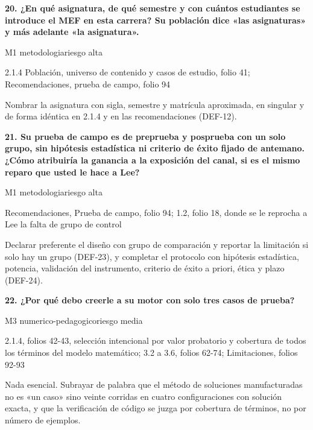 \noindent\casilla\textbf{20. ¿En qué asignatura, de qué semestre y con cuántos estudiantes se introduce el MEF en esta carrera? Su población dice «las asignaturas» y más adelante «la asignatura».}\par
{\small\color{gris}\sffamily M1 metodologia\quad{}\quad riesgo alta}\par
{\small{}2.1.4 Población, universo de contenido y casos de estudio, folio 41; Recomendaciones, prueba de campo, folio 94\par}
{\small{}Nombrar la asignatura con sigla, semestre y matrícula aproximada, en singular y de forma idéntica en 2.1.4 y en las recomendaciones (DEF-12).\par}
\vspace{5pt}
\noindent\casilla\textbf{21. Su prueba de campo es de preprueba y posprueba con un solo grupo, sin hipótesis estadística ni criterio de éxito fijado de antemano. ¿Cómo atribuiría la ganancia a la exposición del canal, si es el mismo reparo que usted le hace a Lee?}\par
{\small\color{gris}\sffamily M1 metodologia\quad{}\quad riesgo alta}\par
{\small{}Recomendaciones, Prueba de campo, folio 94; 1.2, folio 18, donde se le reprocha a Lee la falta de grupo de control\par}
{\small{}Declarar preferente el diseño con grupo de comparación y reportar la limitación si solo hay un grupo (DEF-23), y completar el protocolo con hipótesis estadística, potencia, validación del instrumento, criterio de éxito a priori, ética y plazo (DEF-24).\par}
\vspace{5pt}
\noindent\casilla\textbf{22. ¿Por qué debo creerle a su motor con solo tres casos de prueba?}\par
{\small\color{gris}\sffamily M3 numerico-pedagogico\quad{}\quad riesgo media}\par
{\small{}2.1.4, folios 42-43, selección intencional por valor probatorio y cobertura de todos los términos del modelo matemático; 3.2 a 3.6, folios 62-74; Limitaciones, folios 92-93\par}
{\small{}Nada esencial. Subrayar de palabra que el método de soluciones manufacturadas no es «un caso» sino veinte corridas en cuatro configuraciones con solución exacta, y que la verificación de código se juzga por cobertura de términos, no por número de ejemplos.\par}
